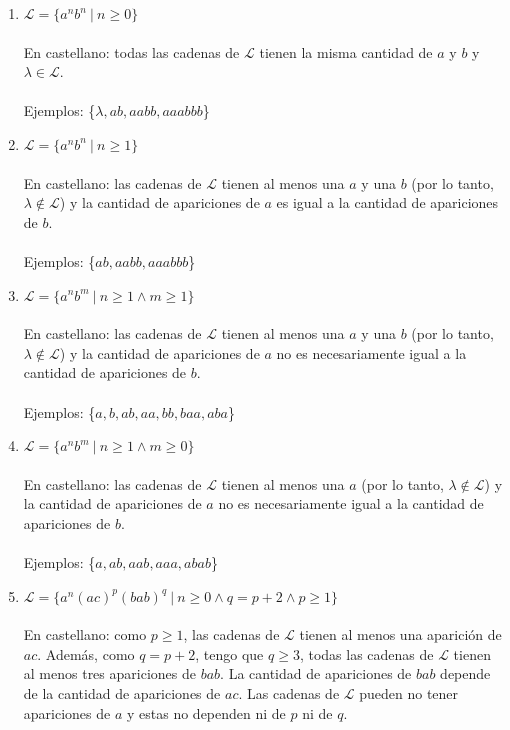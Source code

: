 \documentclass{article}
\begin{document}
{{\begin{enumerate}[label=\alph*.,font=\itshape]
    \item {$\mathcal{L} = \{a^nb^n \ | \ n \geq 0\}$
    \\
    \\
    {En castellano: todas las cadenas de $\mathcal{L}$ tienen la misma cantidad de $a$ y $b$ y $\lambda \in \mathcal{L}$.}
    \\
    \\
    Ejemplos: \{$\lambda, ab, aabb, aaabbb$\}}
    \item {$\mathcal{L} = \{a^nb^n \ | \ n \geq 1\}$
    \\
    \\    
    {En castellano: las cadenas de $\mathcal{L}$ tienen al menos una $a$ y una $b$ (por lo tanto, $\lambda \notin \mathcal{L}$) y la cantidad de apariciones de $a$ es igual a la cantidad de apariciones de $b$.}
    \\
    \\
    Ejemplos: \{$ab, aabb, aaabbb$\}}
    \item {$\mathcal{L} = \{a^nb^m \ | \ n \geq 1 \land m \geq 1\}$
    \\
    \\
    {En castellano: las cadenas de $\mathcal{L}$ tienen al menos una $a$ y una $b$ (por lo tanto, $\lambda \notin \mathcal{L}$) y la cantidad de apariciones de $a$ no es necesariamente igual a la cantidad de apariciones de $b$.}
    \\
    \\
    Ejemplos: \{$ a, b ,ab, aa, bb, baa, aba$\}}
    \item {$\mathcal{L} = \{a^nb^m \ | \ n \geq 1 \land m \geq 0\}$
    \\
    \\
    {En castellano: las cadenas de $\mathcal{L}$ tienen al menos una $a$ (por lo tanto, $\lambda \notin \mathcal{L}$) y la cantidad de apariciones de $a$ no es necesariamente igual a la cantidad de apariciones de $b$.}
    \\
    \\
    Ejemplos: \{$a, ab, aab, aaa, abab$\}}
    \item {$\mathcal{L} = \{ a^n(ac)^p(bab)^q \ | \ n \geq 0 \land q = p + 2 \land p \geq 1 \}$
    \\
    \\
    {En castellano: como $p \geq 1$, las cadenas de $\mathcal{L}$ tienen al menos una aparición de $ac$. Además, como $q = p + 2$, tengo que $q \geq 3$, todas las cadenas de $\mathcal{L}$ tienen al menos tres apariciones de $bab$. La cantidad de apariciones de $bab$ depende de la cantidad de apariciones de $ac$. Las cadenas de $\mathcal{L}$ pueden no tener apariciones de $a$ y estas no dependen ni de $p$ ni de $q$.
}}
\end{enumerate}}}
\end{document}
